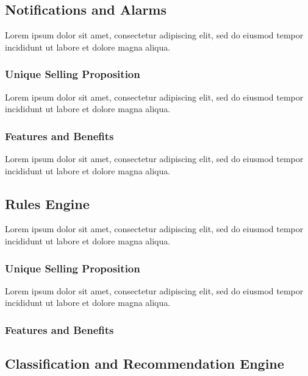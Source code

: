 
\subsection{Notifications and Alarms}
Lorem ipsum dolor sit amet, consectetur adipiscing elit, sed do eiusmod tempor incididunt ut labore et dolore magna aliqua.

\subsubsection*{Unique Selling Proposition}
Lorem ipsum dolor sit amet, consectetur adipiscing elit, sed do eiusmod tempor incididunt ut labore et dolore magna aliqua.

\subsubsection*{Features and Benefits}
Lorem ipsum dolor sit amet, consectetur adipiscing elit, sed do eiusmod tempor incididunt ut labore et dolore magna aliqua.


\subsection{Rules Engine}
Lorem ipsum dolor sit amet, consectetur adipiscing elit, sed do eiusmod tempor incididunt ut labore et dolore magna aliqua.

\subsubsection*{Unique Selling Proposition}

Lorem ipsum dolor sit amet, consectetur adipiscing elit, sed do eiusmod tempor incididunt ut labore et dolore magna aliqua.

\subsubsection*{Features and Benefits}


\subsection{Classification and Recommendation Engine}

